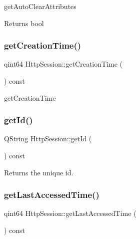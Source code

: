get\+Auto\+Clear\+Attributes 

\begin{DoxyReturn}{Returns}
bool 
\end{DoxyReturn}
\mbox{\label{class_http_session_a2904b92fb73b8cead32068611878a9eb}} 
\subsubsection{\texorpdfstring{get\+Creation\+Time()}{getCreationTime()}}
{\footnotesize\ttfamily qint64 Http\+Session\+::get\+Creation\+Time (\begin{DoxyParamCaption}{ }\end{DoxyParamCaption}) const}



get\+Creation\+Time 

\mbox{\label{class_http_session_a358bfe548463d39bbdc167bd8c630edc}} 
\subsubsection{\texorpdfstring{get\+Id()}{getId()}}
{\footnotesize\ttfamily Q\+String Http\+Session\+::get\+Id (\begin{DoxyParamCaption}{ }\end{DoxyParamCaption}) const}



Returns the unique id. 

\mbox{\label{class_http_session_a539bf0c99bad1aae86ff9b8f411740e1}} 
\subsubsection{\texorpdfstring{get\+Last\+Accessed\+Time()}{getLastAccessedTime()}}
{\footnotesize\ttfamily qint64 Http\+Session\+::get\+Last\+Accessed\+Time (\begin{DoxyParamCaption}{ }\end{DoxyParamCaption}) const}



